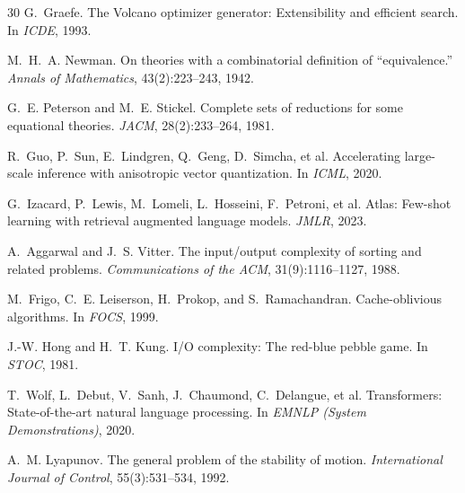 \documentclass{article}
\theoremstyle{definition}
\theoremstyle{remark}
\begin{document}
\begin{thebibliography}{30}
G.~Graefe.
\newblock The Volcano optimizer generator: Extensibility and efficient search.
\newblock In \emph{ICDE}, 1993.

M.~H.~A. Newman.
\newblock On theories with a combinatorial definition of ``equivalence.''
\newblock \emph{Annals of Mathematics}, 43(2):223--243, 1942.

G.~E. Peterson and M.~E. Stickel.
\newblock Complete sets of reductions for some equational theories.
\newblock \emph{JACM}, 28(2):233--264, 1981.

R.~Guo, P.~Sun, E.~Lindgren, Q.~Geng, D.~Simcha, et al.
\newblock Accelerating large-scale inference with anisotropic vector quantization.
\newblock In \emph{ICML}, 2020.

G.~Izacard, P.~Lewis, M.~Lomeli, L.~Hosseini, F.~Petroni, et al.
\newblock Atlas: Few-shot learning with retrieval augmented language models.
\newblock \emph{JMLR}, 2023.

A.~Aggarwal and J.~S. Vitter.
\newblock The input/output complexity of sorting and related problems.
\newblock \emph{Communications of the ACM}, 31(9):1116--1127, 1988.

M.~Frigo, C.~E. Leiserson, H.~Prokop, and S.~Ramachandran.
\newblock Cache-oblivious algorithms.
\newblock In \emph{FOCS}, 1999.

J.-W. Hong and H.~T. Kung.
\newblock I/O complexity: The red-blue pebble game.
\newblock In \emph{STOC}, 1981.

T.~Wolf, L.~Debut, V.~Sanh, J.~Chaumond, C.~Delangue, et al.
\newblock Transformers: State-of-the-art natural language processing.
\newblock In \emph{EMNLP (System Demonstrations)}, 2020.

A.~M. Lyapunov.
\newblock The general problem of the stability of motion.
\newblock \emph{International Journal of Control}, 55(3):531--534, 1992.

\end{thebibliography}


\newpage
\appendix

\end{document}
